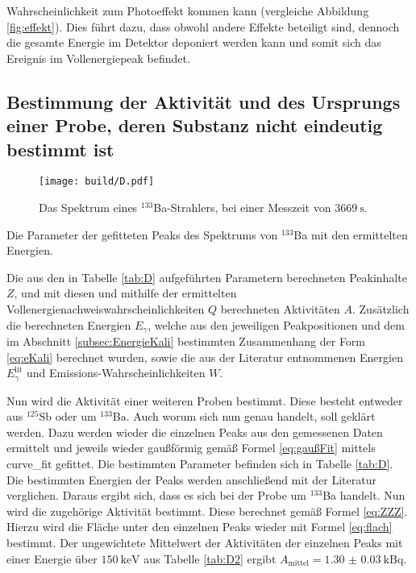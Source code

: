 Wahrscheinlichkeit zum Photoeffekt kommen kann (vergleiche Abbildung \ref{fig:effekt}). Dies führt dazu, dass obwohl andere Effekte beteiligt sind, dennoch die gesamte Energie im Detektor deponiert werden kann und somit sich das Ereignis im Vollenergiepeak befindet.


\subsection{Bestimmung der Aktivität und des Ursprungs einer Probe, deren Substanz nicht eindeutig bestimmt ist}
\begin{figure}
	\centering
	\texttt{[image: build/D.pdf]}
	\caption{Das Spektrum eines $^{133}$Ba-Strahlers, bei einer Messzeit von $\SI{3669}{\second}$.}
	\label{fig:3}
\end{figure}
\begin{table}
	\centering
	\caption{Die Parameter der gefitteten Peaks des Spektrums von $^{133}$Ba mit den ermittelten Energien.}
	
\end{table}
\begin{table}
	\centering
	\caption{Die aus den in Tabelle \ref{tab:D} aufgeführten Parametern berechneten Peakinhalte $Z$, und mit diesen und mithilfe der ermittelten Vollenergienachweiswahrscheinlichkeiten $Q$ berechneten Aktivitäten $A$. Zusätzlich die berechneten Energien $E_\gamma$, welche aus den jeweiligen Peakpositionen und dem im Abschnitt \ref{subsec:EnergieKali} bestimmten Zusammenhang der Form \eqref{eq:eKali} berechnet wurden, sowie die aus der Literatur entnommenen Energien $E_\gamma^\text{lit}$ und Emissions-Wahrscheinlichkeiten $W$.}
	
\end{table}
Nun wird die Aktivität einer weiteren Proben bestimmt. Diese besteht entweder aus $^{125}$Sb oder um $^{133}$Ba. Auch worum sich nun genau handelt, soll geklärt werden. Dazu werden wieder die einzelnen Peaks aus den gemessenen Daten ermittelt und jeweils wieder gaußförmig gemäß Formel \eqref{eq:gaußFit} mittels curve\_fit \cite{scipy} gefittet. Die bestimmten Parameter befinden sich in Tabelle \ref{tab:D}. Die bestimmten Energien der Peaks werden anschließend mit der Literatur \cite{KHAZOV2011855} verglichen. Daraus ergibt sich, dass es sich bei der Probe um $^{133}$Ba handelt. Nun wird die zugehörige Aktivität bestimmt. Diese berechnet gemäß Formel \eqref{eq:ZZZ}. Hierzu wird die Fläche unter den einzelnen Peaks wieder mit Formel \eqref{eq:flach} bestimmt. Der ungewichtete Mittelwert der Aktivitäten der einzelnen Peaks mit einer Energie über $\SI{150}{\kilo\electronvolt}$ aus Tabelle \ref{tab:D2} ergibt $A_\text{mittel} = \SI{1.30(3)}{\kilo\becquerel}$.


